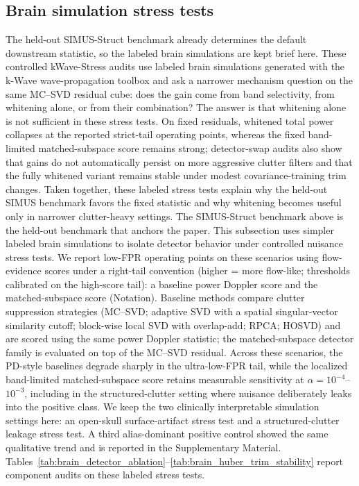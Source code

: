 \documentclass[11pt]{article}
\newif\ifPAPERONLY
\begin{document}
\subsection{Brain simulation stress tests}
\ifPAPERONLY
The held-out SIMUS-Struct benchmark already determines the default downstream statistic, so the labeled brain simulations are kept brief here. These controlled kWave-Stress audits use labeled brain simulations generated with the k-Wave wave-propagation toolbox \cite{TreebyCoxKWave2010} and ask a narrower mechanism question on the same MC--SVD residual cube: does the gain come from band selectivity, from whitening alone, or from their combination? The answer is that whitening alone is not sufficient in these stress tests. On fixed residuals, whitened total power collapses at the reported strict-tail operating points, whereas the fixed band-limited matched-subspace score remains strong; detector-swap audits also show that gains do not automatically persist on more aggressive clutter filters and that the fully whitened variant remains stable under modest covariance-training trim changes. Taken together, these labeled stress tests explain why the held-out SIMUS benchmark favors the fixed statistic and why whitening becomes useful only in narrower clutter-heavy settings.
\else
The SIMUS-Struct benchmark above is the held-out benchmark that anchors the paper. This subsection uses simpler labeled brain simulations to isolate detector behavior under controlled nuisance stress tests. We report low-FPR operating points on these scenarios using flow-evidence scores under a right-tail convention (higher = more flow-like; thresholds calibrated on the high-score tail): a baseline power Doppler score and the matched-subspace score (Notation). Baseline methods compare clutter suppression strategies (MC--SVD; adaptive SVD with a spatial singular-vector similarity cutoff; block-wise local SVD with overlap-add; RPCA; HOSVD) and are scored using the same power Doppler statistic; the matched-subspace detector family is evaluated on top of the MC--SVD residual. Across these scenarios, the PD-style baselines degrade sharply in the ultra-low-FPR tail, while the localized band-limited matched-subspace score retains measurable sensitivity at $\alpha=10^{-4}$--$10^{-3}$, including in the structured-clutter setting where nuisance deliberately leaks into the positive class. We keep the two clinically interpretable simulation settings here: an open-skull surface-artifact stress test and a structured-clutter leakage stress test. A third alias-dominant positive control showed the same qualitative trend and is reported in the Supplementary Material. Tables~\ref{tab:brain_detector_ablation}--\ref{tab:brain_huber_trim_stability} report component audits on these labeled stress tests.
\end{document}
